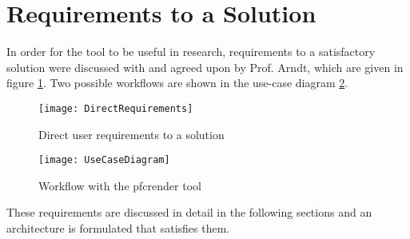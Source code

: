 \section{Requirements to a Solution}
In order for the tool to be useful in research, requirements to a satisfactory solution were discussed with and agreed upon by Prof. Arndt, which are given in figure \ref{fig:directreq}. Two possible workflows are shown in the use-case diagram \ref{fig:uc}.

\begin{figure}[htb]
	\centering
	\texttt{[image: DirectRequirements]}
	\caption{Direct user requirements to a solution}
	\label{fig:directreq}
\end{figure}


\begin{figure}[htb]
	\centering
	\texttt{[image: UseCaseDiagram]}
	\caption{Workflow with the pfcrender tool}
	\label{fig:uc}
\end{figure}

These requirements are discussed in detail in the following sections and an architecture is formulated that satisfies them.
